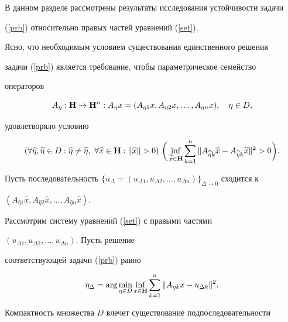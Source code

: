 В данном разделе рассмотрены результаты исследования устойчивости задачи


(\ref{prb}) относительно правых частей уравнений (\ref{set}).


Ясно, что необходимым условием существования единственного решения


задачи (\ref{prb}) является требование, чтобы параметрическое семейство


операторов 


$$


A_{\eta}: {\bold H}\to {\bold H}^n: A_{\eta}x= ( A_{\eta


1}x,A_{\eta 2}x,\dotsc,A_{\eta n}x ), \quad \eta \in D ,


$$


удовлетворяло условию 


\begin{equation}


\label{stbcond1}


( \forall \widehat \eta, \widetilde \eta \in D: \widehat \eta


\neq \widetilde \eta,\ \forall \widehat x \in {\bold H}: \| \widehat x\| >0 


)\ \bigg( \inf_{\widetilde x\in {\bold H }}\sum_{k=1}^n\| A_{\widehat 


\eta k}\widehat x-A_{\widetilde \eta k}\widetilde x\|^2 >0 \bigg). 


\end{equation}





Пусть последовательность $\{ u_\Delta =(u_{\Delta 1},u_{\Delta 2},\dotsc,


u_{\Delta n})\}_{\Delta \to 0}$ сходится к 


$( A_{\widehat \eta 1}\widehat x,A_{\widehat \eta 2}\widehat x,\dotsc,


A_{\widehat \eta n}\widehat x).$


Рассмотрим систему уравнений (\ref{set}) с правыми частями


$(u_{\Delta 1},u_{\Delta 2},\dotsc, u_{\Delta n})$. Пусть решение


соответствующей задачи (\ref{prb}) равно


$$


\eta_\Delta =\arg \min_{\eta \in D}\inf_{x\in {\bold H}}\sum_{k=1}^n\|


A_{\eta k}x-u_{\Delta k}\|^2. 


$$


Компактность множества $D$ влечет существование подпоследовательности


